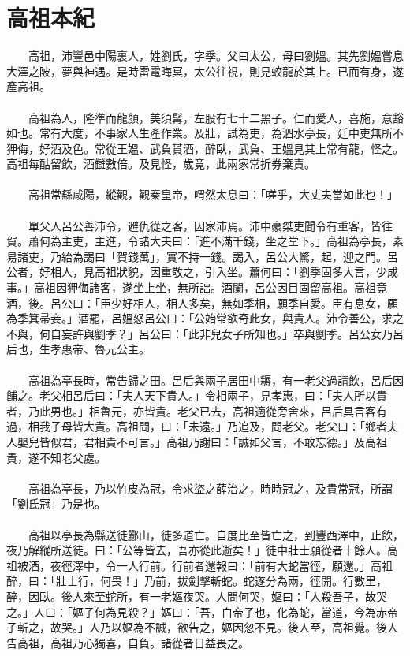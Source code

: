 \section{高祖本紀}
　　高祖，沛豐邑中陽裏人，姓劉氏，字季。父曰太公，母曰劉媼。其先劉媼嘗息大澤之陂，夢與神遇。是時雷電晦冥，太公往視，則見蛟龍於其上。已而有身，遂產高祖。
\\\\
　　高祖為人，隆準而龍顏，美須髯，左股有七十二黑子。仁而愛人，喜施，意豁如也。常有大度，不事家人生產作業。及壯，試為吏，為泗水亭長，廷中吏無所不狎侮，好酒及色。常從王媼、武負貰酒，醉臥，武負、王媼見其上常有龍，怪之。高祖每酤留飲，酒讎數倍。及見怪，歲竟，此兩家常折券棄責。
\\\\
　　高祖常繇咸陽，縱觀，觀秦皇帝，喟然太息曰：「嗟乎，大丈夫當如此也！」
\\\\
　　單父人呂公善沛令，避仇從之客，因家沛焉。沛中豪桀吏聞令有重客，皆往賀。蕭何為主吏，主進，令諸大夫曰：「進不滿千錢，坐之堂下。」高祖為亭長，素易諸吏，乃紿為謁曰「賀錢萬」，實不持一錢。謁入，呂公大驚，起，迎之門。呂公者，好相人，見高祖狀貌，因重敬之，引入坐。蕭何曰：「劉季固多大言，少成事。」高祖因狎侮諸客，遂坐上坐，無所詘。酒闌，呂公因目固留高祖。高祖竟酒，後。呂公曰：「臣少好相人，相人多矣，無如季相，願季自愛。臣有息女，願為季箕帚妾。」酒罷，呂媼怒呂公曰：「公始常欲奇此女，與貴人。沛令善公，求之不與，何自妄許與劉季？」呂公曰：「此非兒女子所知也。」卒與劉季。呂公女乃呂后也，生孝惠帝、魯元公主。
\\\\
　　高祖為亭長時，常告歸之田。呂后與兩子居田中耨，有一老父過請飲，呂后因餔之。老父相呂后曰：「夫人天下貴人。」令相兩子，見孝惠，曰：「夫人所以貴者，乃此男也。」相魯元，亦皆貴。老父已去，高祖適從旁舍來，呂后具言客有過，相我子母皆大貴。高祖問，曰：「未遠。」乃追及，問老父。老父曰：「鄉者夫人嬰兒皆似君，君相貴不可言。」高祖乃謝曰：「誠如父言，不敢忘德。」及高祖貴，遂不知老父處。
\\\\
　　高祖為亭長，乃以竹皮為冠，令求盜之薛治之，時時冠之，及貴常冠，所謂「劉氏冠」乃是也。
\\\\
　　高祖以亭長為縣送徒酈山，徒多道亡。自度比至皆亡之，到豐西澤中，止飲，夜乃解縱所送徒。曰：「公等皆去，吾亦從此逝矣！」徒中壯士願從者十餘人。高祖被酒，夜徑澤中，令一人行前。行前者還報曰：「前有大蛇當徑，願還。」高祖醉，曰：「壯士行，何畏！」乃前，拔劍擊斬蛇。蛇遂分為兩，徑開。行數里，醉，因臥。後人來至蛇所，有一老嫗夜哭。人問何哭，嫗曰：「人殺吾子，故哭之。」人曰：「嫗子何為見殺？」嫗曰：「吾，白帝子也，化為蛇，當道，今為赤帝子斬之，故哭。」人乃以嫗為不誠，欲告之，嫗因忽不見。後人至，高祖覺。後人告高祖，高祖乃心獨喜，自負。諸從者日益畏之。
